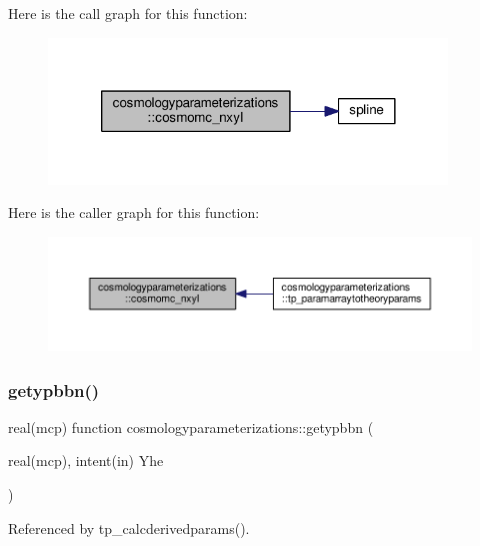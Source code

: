 Here is the call graph for this function\+:
\nopagebreak
\begin{figure}[H]
\begin{center}
\leavevmode
\includegraphics[width=300pt]{namespacecosmologyparameterizations_ae660404b993706170ddf14a2a0904812_cgraph}
\end{center}
\end{figure}
Here is the caller graph for this function\+:
\nopagebreak
\begin{figure}[H]
\begin{center}
\leavevmode
\includegraphics[width=350pt]{namespacecosmologyparameterizations_ae660404b993706170ddf14a2a0904812_icgraph}
\end{center}
\end{figure}
\mbox{\label{namespacecosmologyparameterizations_a211ef353fd86e7f656da5d1ee63e96de}} 
\subsubsection{\texorpdfstring{getypbbn()}{getypbbn()}}
{\footnotesize\ttfamily real(mcp) function cosmologyparameterizations\+::getypbbn (\begin{DoxyParamCaption}\item[{real(mcp), intent(in)}]{Yhe }\end{DoxyParamCaption})}



Referenced by tp\+\_\+calcderivedparams().

